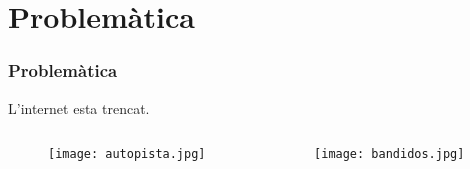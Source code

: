 \section{Problemàtica}
\begin{frame}
\frametitle{Problemàtica}

  L'internet esta trencat.
  \begin{columns}
    \begin{column}{0.5\textwidth}
      \begin{figure}[htbp!]
        \texttt{[image: autopista.jpg]}
      \end{figure}
    \end{column}

    \begin{column}{0.5\textwidth}
      \begin{figure}[htbp!]
        \texttt{[image: bandidos.jpg]}
     \end{figure}
    \end{column}
  \end{columns}

\end{frame}
